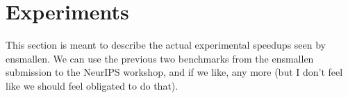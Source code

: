 \section{Experiments}
\label{sec:experiments}

This section is meant to describe the actual experimental speedups seen by
ensmallen.  We can use the previous two benchmarks from the ensmallen submission
to the NeurIPS workshop, and if we like, any more (but I don't feel like we
should feel obligated to do that).

